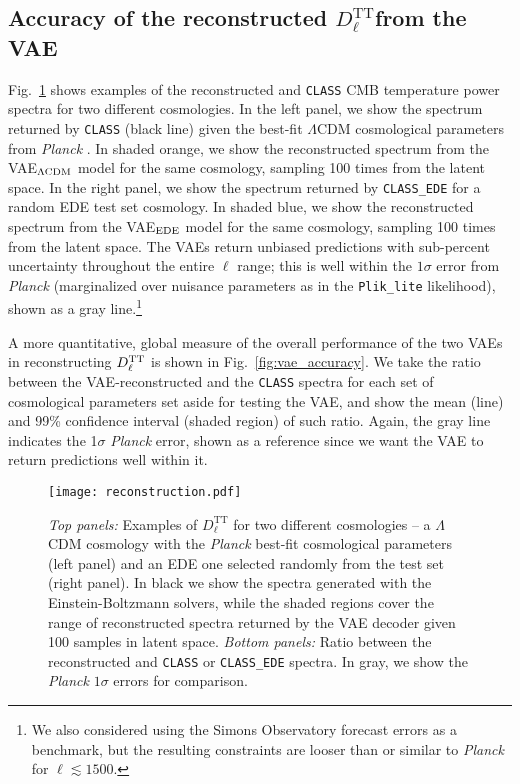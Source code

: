 \documentclass[aps, prd, reprint, superscriptaddress, nofootinbib, bibnotes]{revtex4-2}
\newcommand{\Planck}{\textit{Planck}}
\newcommand{\Dl}{$D_{\ell}^\mathrm{TT}$}
\begin{document}
\subsection{Accuracy of the reconstructed \Dl from the VAE}
Fig.~\ref{fig:Dl_bestfit_example} shows examples of the reconstructed and \texttt{CLASS} CMB temperature power spectra for two different cosmologies. In the left panel, we show the spectrum returned by \texttt{CLASS} (black line) given the best-fit $\Lambda$CDM cosmological parameters from \Planck{} \citep{Planck:2019nip}. In shaded orange, we show the reconstructed spectrum from the VAE$_{\Lambda\rm{CDM}}$ model for the same cosmology, sampling 100 times from the latent space. In the right panel, we show the spectrum returned by \texttt{CLASS\_EDE} for a random EDE test set cosmology. In shaded blue, we show the reconstructed spectrum from the VAE$_{\rm{EDE}}$ model for the same cosmology, sampling 100 times from the latent space. The VAEs return unbiased predictions with sub-percent uncertainty throughout the entire $\ell$ range; this is well within the $1\sigma$ error from \Planck{} (marginalized over nuisance parameters as in the \texttt{Plik\_lite} likelihood), shown as a gray line.\footnote{We also considered using the Simons Observatory \cite{SimonsObservatory:2018koc} forecast errors as a benchmark, but the resulting constraints are looser than or similar to \Planck{} for $\ell\lesssim 1500$.}

A more quantitative, global measure of the overall performance of the two VAEs in reconstructing $D_{\ell}^{\rm TT}$ is shown in Fig.~\ref{fig:vae_accuracy}. We take the ratio between the VAE-reconstructed and the \texttt{CLASS} spectra for each set of cosmological parameters set aside for testing the VAE, and show the mean (line) and 99\% confidence interval (shaded region) of such ratio. 
Again, the gray line indicates the 1$\sigma$ \Planck{} error, shown as a reference since we want the VAE to return predictions well within it.

\begin{figure}
\centering
\texttt{[image: reconstruction.pdf]}
\caption{\textit{Top panels:} Examples of \Dl{} for two different cosmologies -- a $\Lambda$CDM cosmology with the \Planck{} best-fit cosmological parameters (left panel) and an EDE one selected randomly from the test set (right panel). In black we show the spectra generated with the Einstein-Boltzmann solvers, while the shaded regions cover the range of reconstructed spectra returned by the VAE decoder given 100 samples in latent space. \textit{Bottom panels:} Ratio between the reconstructed and \texttt{CLASS} or \texttt{CLASS\_EDE} spectra. In gray, we show the \Planck{} $1\sigma$ errors for comparison.}
\label{fig:Dl_bestfit_example}
\end{figure}
\end{document}
